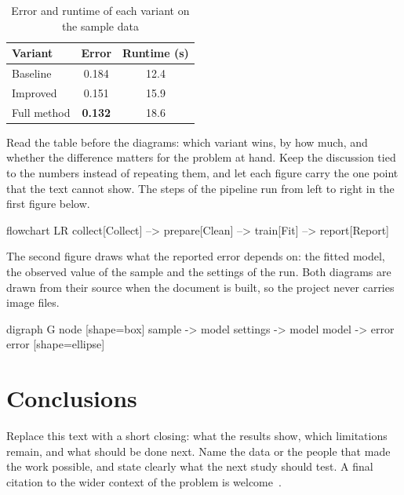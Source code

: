 \documentclass[10pt,journal]{IEEEtran}
\begin{document}
  \begin{table}[H]
    \centering
    \caption{Error and runtime of each variant on the sample data}
    \label{tab:scores}
    \begin{tabular}{lcc}
      \toprule
      Variant & Error & Runtime (s) \\
      \midrule
      Baseline & 0.184 & 12.4 \\
      Improved & 0.151 & 15.9 \\
      Full method & \textbf{0.132} & 18.6 \\
      \bottomrule
    \end{tabular}
  \end{table}

  Read the table before the diagrams: which variant wins, by how much, and
  whether the difference matters for the problem at hand. Keep the discussion
  tied to the numbers instead of repeating them, and let each figure carry the
  one point that the text cannot show. The steps of the pipeline run from left
  to right in the first figure below.

  \begin{mermaid}[style=technical, pos=H, caption={Pipeline used to obtain the results}, width=\linewidth]
    flowchart LR
    collect[Collect] --> prepare[Clean] --> train[Fit] --> report[Report]
  \end{mermaid}

  The second figure draws what the reported error depends on: the fitted model,
  the observed value of the sample and the settings of the run. Both diagrams
  are drawn from their source when the document is built, so the project never
  carries image files.

  \begin{graphviz}[style=editorial, pos=H, caption={Terms that the reported error depends on}, width=\linewidth]
    digraph G {
      node [shape=box]
      sample -> model
      settings -> model
      model -> error
      error [shape=ellipse]
    }
  \end{graphviz}

  \section{Conclusions}
  Replace this text with a short closing: what the results show, which
  limitations remain, and what should be done next. Name the data or the
  people that made the work possible, and state clearly what the next study
  should test. A final citation to the wider context of the problem is
  welcome~\cite{openlab2024}.
\end{document}
